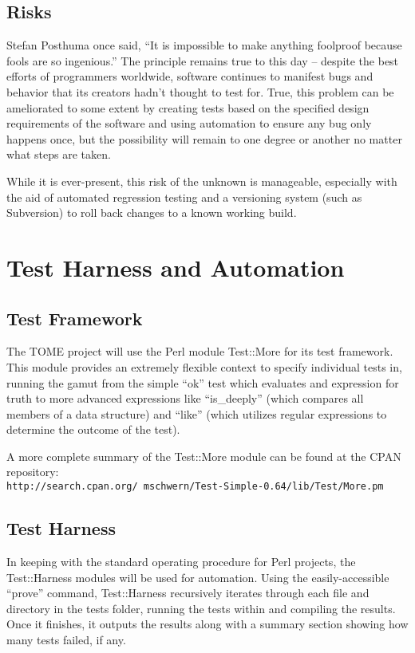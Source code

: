 \documentclass[12pt,titlepage]{article}
\begin{document}
\subsection{Risks}
Stefan Posthuma once said, ``It is impossible to make anything foolproof because fools are so ingenious.''  The principle remains true to this day -- despite the best efforts of programmers worldwide, software continues to manifest bugs and behavior that its creators hadn't thought to test for.  True, this problem can be ameliorated to some extent by creating tests based on the specified design requirements of the software and using automation to ensure any bug only happens once, but the possibility will remain to one degree or another no matter what steps are taken.

While it is ever-present, this risk of the unknown is manageable, especially with the aid of automated regression testing and a versioning system (such as Subversion) to roll back changes to a known working build.

\section{Test Harness and Automation}
\subsection{Test Framework}
The TOME project will use the Perl module Test::More for its test framework.  This module provides an extremely flexible context to specify individual tests in, running the gamut from the simple ``ok'' test which evaluates and expression for truth to more advanced expressions like ``is\_deeply'' (which compares all members of a data structure) and ``like'' (which utilizes regular expressions to determine the outcome of the test).

A more complete summary of the Test::More module can be found at the CPAN repository: \\
\texttt{http://search.cpan.org/~mschwern/Test-Simple-0.64/lib/Test/More.pm}

\subsection{Test Harness}
In keeping with the standard operating procedure for Perl projects, the Test::Harness modules will be used for automation.  Using the easily-accessible ``prove'' command, Test::Harness recursively iterates through each file and directory in the tests folder, running the tests within and compiling the results.  Once it finishes, it outputs the results along with a summary section showing how many tests failed, if any.
\end{document}
